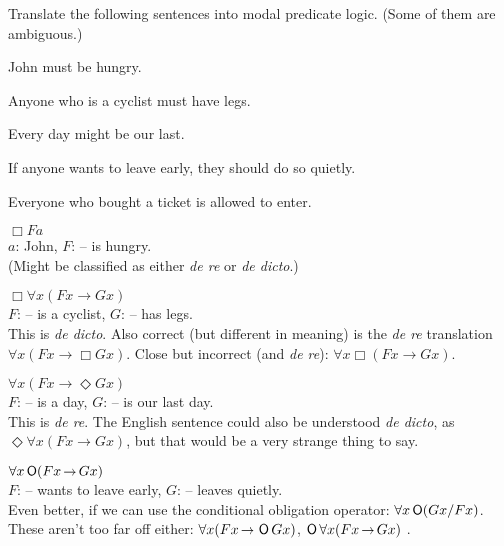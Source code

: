 \begin{exercise}
  Translate the following sentences into modal predicate logic. (Some of them
  are ambiguous.)
  \begin{exlist}
  \item John must be hungry.
  \item Anyone who is a cyclist must have legs.
  \item Every day might be our last.
  \item If anyone wants to leave early, they should do so quietly.
  \item Everyone who bought a ticket is allowed to enter.
  \end{exlist}
\end{exercise}
\begin{solution}

  \begin{sollist}
    \item $\Box Fa$ \\ $a$: John, $F$: -- is hungry.\\[1mm]
    (Might be classified as either \emph{de re} or \emph{de dicto}.)\\[-2mm]
    
  \item $\Box \forall x(Fx \to Gx)$ \\ $F$: -- is a cyclist, $G$: -- has legs.\\[1mm]
    This is \emph{de dicto}. Also correct (but different in meaning) is the \emph{de re} translation $\forall x (Fx \to \Box Gx)$.
    Close but incorrect (and \emph{de re}): $\forall x \Box(Fx \to Gx)$.\\[-2mm] 
    
  \item $\forall x (Fx \to \Diamond Gx)$ \\ $F$: -- is a day, $G$: -- is our last day.\\[1mm]
    This is \emph{de re}. The English sentence could also be understood \emph{de dicto}, as 
    $\Diamond \forall x (Fx \to Gx)$, but that would be a very strange
    thing to say.\\[-2mm]
    
  \item %
    $\forall x \Ob(Fx \to Gx)$\\
    $F$: -- wants to leave early, $G$: -- leaves quietly.\\[1mm]
    Even better, if we can use the conditional obligation operator: $\forall x \operatorname{\mathsf{O}}(Gx / Fx)$. These aren't too far off either:
    $\forall x (Fx \to \Ob Gx)$, $\Ob\forall x(Fx \to Gx)$ .


\end{sollist}
\end{solution}
